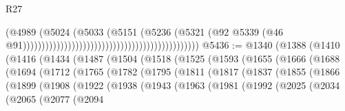 \begin{lexlean}{R27}
\begin{coremodule}
                                                                                  (@4989
                                                                                    (@5024
                                                                                      (@5033
                                                                                        (@5151
                                                                                          (@5236
                                                                                            (@5321
                                                                                              (@92
                                                                                                @5339
                                                                                                (@46
                                                                                                  @91)))))))))))))))))))))))))))))))))))))))))))))))
@5436 := @1340
    (@1388
      (@1410
        (@1416
          (@1434
            (@1487
              (@1504
                (@1518
                  (@1525
                    (@1593
                      (@1655
                        (@1666
                          (@1688
                            (@1694
                              (@1712
                                (@1765
                                  (@1782
                                    (@1795
                                      (@1811
                                        (@1817
                                          (@1837
                                            (@1855
                                              (@1866
                                                (@1899
                                                  (@1908
                                                    (@1922
                                                      (@1938
                                                        (@1943
                                                          (@1963
                                                            (@1981
                                                              (@1992
                                                                (@2025
                                                                  (@2034
                                                                    (@2065
                                                                      (@2077
                                                                        (@2094

\end{coremodule}
\end{lexlean}
